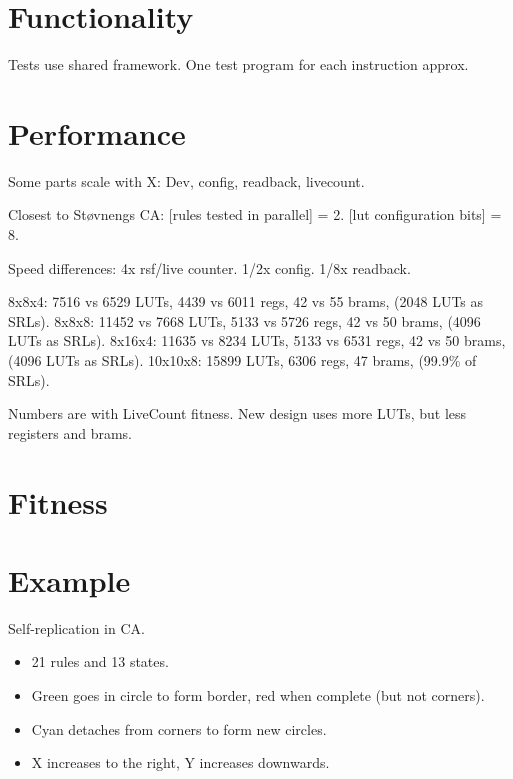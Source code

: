 \TODO

\section{Functionality}

\TODO
Tests use shared framework.
One test program for each instruction approx.

\section{Performance}

\TODO

Some parts scale with X: Dev, config, readback, livecount.

Closest to Støvnengs CA:
[rules tested in parallel] = 2.
[lut configuration bits] = 8.

Speed differences:
4x rsf/live counter.
1/2x config.
1/8x readback.

8x8x4: 7516 vs 6529 LUTs, 4439 vs 6011 regs, 42 vs 55 brams, (2048 LUTs as SRLs).
8x8x8: 11452 vs 7668 LUTs, 5133 vs 5726 regs, 42 vs 50 brams, (4096 LUTs as SRLs).
8x16x4: 11635 vs 8234 LUTs, 5133 vs 6531 regs, 42 vs 50 brams, (4096 LUTs as SRLs).
10x10x8: 15899 LUTs, 6306 regs, 47 brams, (99.9\% of SRLs).

Numbers are with LiveCount fitness.
New design uses more LUTs, but less registers and brams.


\section{Fitness}

\TODO

\section{Example}

Self-replication in CA.

\begin{itemize}
    \item 21 rules and 13 states.
    \item Green goes in circle to form border, red when complete (but not corners).
    \item Cyan detaches from corners to form new circles.
    \item X increases to the right, Y increases downwards.
\end{itemize}

